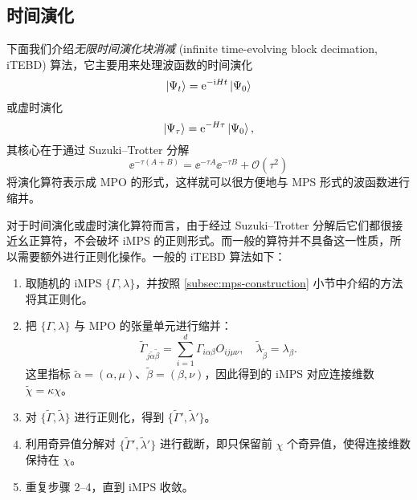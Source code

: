 \subsection{时间演化}

下面我们介绍\emph{无限时间演化块消减} (infinite time-evolving block decimation, iTEBD)\cite{vidal2007classical,orus2008infinite} 算法，它主要用来处理波函数的时间演化
\begin{equation}
  \ket{\Psi_t} = \ee^{-\ii Ht} \ket{\Psi_0}
\end{equation}
或虚时演化
\begin{equation}
  \ket{\Psi_\tau} = \ee^{-H\tau} \ket{\Psi_0},
\end{equation}
其核心在于通过 Suzuki--Trotter 分解\cite{sornborger1999higher}
\begin{equation}
  \ee^{-\tau(A+B)} = \ee^{-\tau A} \ee^{-\tau B} + \mathcal{O}(\tau^2)
\end{equation}
将演化算符表示成 MPO 的形式，这样就可以很方便地与 MPS 形式的波函数进行缩并。

对于时间演化或虚时演化算符而言，由于经过 Suzuki--Trotter 分解后它们都很接近幺正算符，不会破坏 iMPS 的正则形式。而一般的算符并不具备这一性质，所以需要额外进行正则化操作。一般的 iTEBD 算法如下：

\begin{enumerate}
  \item 取随机的 iMPS $\{\Gamma,\lambda\}$，并按照 \ref{subsec:mps-construction} 小节中介绍的方法将其正则化。

  \item 把 $\{\Gamma,\lambda\}$ 与 MPO 的张量单元进行缩并：
    \begin{equation}
      \tilde{\Gamma}_{j\tilde{\alpha}\tilde{\beta}} = \sum_{i=1}^d \Gamma_{i\alpha\beta} O_{ij\mu\nu}, \quad
      \tilde{\lambda}_{\tilde{\beta}} = \lambda_\beta.
    \end{equation}
    这里指标 $\tilde{\alpha}=(\alpha,\mu)$、$\tilde{\beta}=(\beta,\nu)$，因此得到的 iMPS 对应连接维数 $\tilde{\chi}=\kappa\chi$。

  \item 对 $\{\tilde{\Gamma},\tilde{\lambda}\}$ 进行正则化，得到 $\{\tilde{\Gamma}',\tilde{\lambda}'\}$。

  \item 利用奇异值分解对 $\{\tilde{\Gamma}',\tilde{\lambda}'\}$ 进行截断，即只保留前 $\chi$ 个奇异值，使得连接维数保持在 $\chi$。

  \item 重复步骤 2--4，直到 iMPS 收敛。
\end{enumerate}

